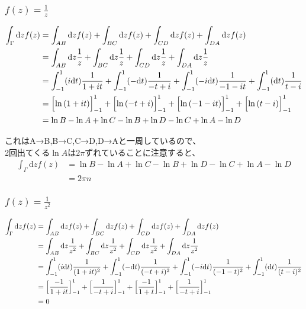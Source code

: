 \documentclass[dvipdfmx,a4paper]{jsarticle}
\begin{document}
\subsubsection{$f(z) = \frac{1}{z}$}
\begin{align*}
\int_\Gamma\mathrm d z f(z) &= \int_{AB}\mathrm d z f(z) +  \int_{BC}\mathrm d z f(z) +  \int_{CD}\mathrm d z f(z) + \int_{DA}\mathrm d z f(z)\\
&= \int_{AB}\mathrm d z \frac{1}{z} +  \int_{BC}\mathrm d z \frac{1}{z} +  \int_{CD}\mathrm d z \frac{1}{z} + \int_{DA}\mathrm d z \frac{1}{z}\\
&= \int_{-1}^{1} (i\mathrm d t)\frac{1}{1+it} + \int_{-1}^{1} (-\mathrm d t)\frac{1}{-t + i} + \int_{-1}^{1} (-i\mathrm d t)\frac{1}{-1 -it} + \int_{-1}^{1} (\mathrm d t)\frac{1}{t-i} \\
&= \Bigl[\ln{(1 + it)}\Bigr]^1_{-1} + \Bigl[\ln{(-t+i)}\Bigr]^1_{-1} + \Bigl[\ln{(-1-it)}\Bigr]^1_{-1} + \Bigl[\ln{(t-i)}\Bigr]^1_{-1}\\
&= \ln{B} - \ln{A} + \ln{C} - \ln{B} +\ln{D} - \ln{C} + \ln{A} - \ln{D}
\end{align*}

これはA→B,B→C,C→D,D→Aと一周しているので、\\
2回出てくる$\ln{A}$は$2\pi$ずれていることに注意すると、
\begin{align*}
\int_\Gamma\mathrm d z f(z) &= \ln{B} - \ln{A} + \ln{C} - \ln{B} +\ln{D} - \ln{C} + \ln{A} - \ln{D}\\ 
&= 2\pi n
\end{align*}

\subsubsection{$f(z) = \frac{1}{z^2}$}
\begin{align*}
\int_\Gamma\mathrm d z f(z) &= \int_{AB}\mathrm d z f(z) +  \int_{BC}\mathrm d z f(z) +  \int_{CD}\mathrm d z f(z) + \int_{DA}\mathrm d z f(z)\\
&= \int_{AB}\mathrm d z \frac{1}{z^2} +  \int_{BC}\mathrm d z \frac{1}{z^2} +  \int_{CD}\mathrm d z \frac{1}{z^2} + \int_{DA}\mathrm d z \frac{1}{z^2}\\
&= \int_{-1}^{1} (i\mathrm d t)\frac{1}{(1+it)^2} + \int_{-1}^{1} (-\mathrm d t)\frac{1}{(-t+i)^2} + \int_{-1}^{1} (-i\mathrm d t)\frac{1}{(-1-t)^2} + \int_{-1}^{1} (\mathrm d t)\frac{1}{(t-i)^2} \\
&= \Bigl[\frac{-1}{1+it}\Bigr]^1_{-1} + \Bigl[\frac{1}{-t+i}\Bigr]^1_{-1} + \Bigl[\frac{-1}{1+t}\Bigr]^1_{-1} + \Bigl[\frac{1}{-t+i}\Bigr]^1_{-1}\\
&= 0
\end{align*}
\end{document}
